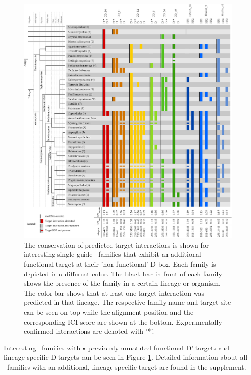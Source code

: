 \begin{figure}
  \centering
  \includegraphics[width=\textwidth]{pics/conservation_lineage_specific_targets.eps}
  \caption{The conservation of predicted target interactions is shown for
    interesting single guide \cd\ families that exhibit an additional
    functional target at their 'non-functional' D box. Each family is
    depicted in a different color. The black bar in front of each
    family shows the presence of the family in a certain lineage or
    organism. The color bar shows that at least one target interaction
    was predicted in that lineage. The respective family name and target
    site can be seen on top while the alignment position and the
    corresponding ICI score are shown at the bottom. Experimentally
    confirmed interactions are denoted with '*'.}
  \label{fig:additional_targets}
\end{figure}

Interesting \cd\ families with a previously annotated functional D'
targets and lineage specific D targets can be seen in Figure
\ref{fig:additional_targets}. Detailed information about all \sno\
families with an additional, lineage specific target are found in the supplement.

